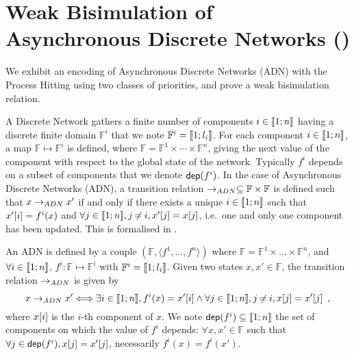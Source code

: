 
\section{Weak Bisimulation of Asynchronous Discrete Networks ()}
\label{suppl:demotrad}

We exhibit an encoding of Asynchronous Discrete Networks (ADN) with the Process
Hitting using two classes of priorities, and prove a weak bisimulation relation.

A Discrete Network gathers a finite number of components $i\in\llbracket 1; n \rrbracket$ having a discrete finite domain
$\mathbb F^i$ that we note $\mathbb{F}^i = \llbracket 1; l_i \rrbracket$.
For each component $i\in\llbracket 1; n \rrbracket$, a map $\mathbb F \mapsto \mathbb F^i$ is defined, where
$\mathbb F = \mathbb F^1 \times \cdots \times \mathbb F^n$, giving the next value of the component
with respect to the global state of the network.
Typically $f^i$ depends on a subset of components that we denote $\mathsf{dep}(f^i)$.
In the case of Asynchronous Discrete Networks (ADN), a transition relation $\rightarrow_{ADN}\subseteq \mathbb
F\times \mathbb F$ is defined such that $x\rightarrow_{ADN} x'$ if and only if there exists a unique
$i\in\llbracket 1; n \rrbracket$ such that $x'[{i}]=f^i(x)$ and $\forall j\in\llbracket 1; n \rrbracket, j\not\nobreak\mkern -2mu = i, x'[{j}]
=x[{j}]$, i.e.~one and only one component has been updated.
This is formalised in .

\begin{definition}
\label{def:DN}
  An ADN is defined by a couple $(\mathbb F, \langle f^1, \dots, f^n \rangle)$
  where $\mathbb{F} = \mathbb{F}^1\times\dots\times\mathbb{F}^n$,
  and $\forall i\in\llbracket 1; n \rrbracket$,
  $f^i: \mathbb{F} \mapsto \mathbb{F}^i$ with
  $\mathbb{F}^i = \llbracket 1; l_i \rrbracket$.
  Given two states $x,x'\in\mathbb F$, the transition relation $\rightarrow_{ADN}$ is given by
  \[
  x\rightarrow_{ADN} x' \Longleftrightarrow
    \exists i\in\llbracket 1; n \rrbracket, f^i(x)=x'[{i}]
    \wedge \forall j\in\llbracket 1; n \rrbracket, j\not\nobreak\mkern -2mu = i, x[{j}]=x'[{j}]
  \enspace,
  \]
  where $x[{i}]$ is the $i$-th component of $x$.
  We note $\mathsf{dep}(f^i)\subseteq \llbracket 1; n \rrbracket$ the set of components on which the value of $f^i$
  depends: $\forall x,x'\in \mathbb F$ such that $\forall
  j\in\mathsf{dep}(f^i), x[{j}]=x'[{j}]$, necessarily $f^i(x)=f^i(x')$.
\end{definition}

